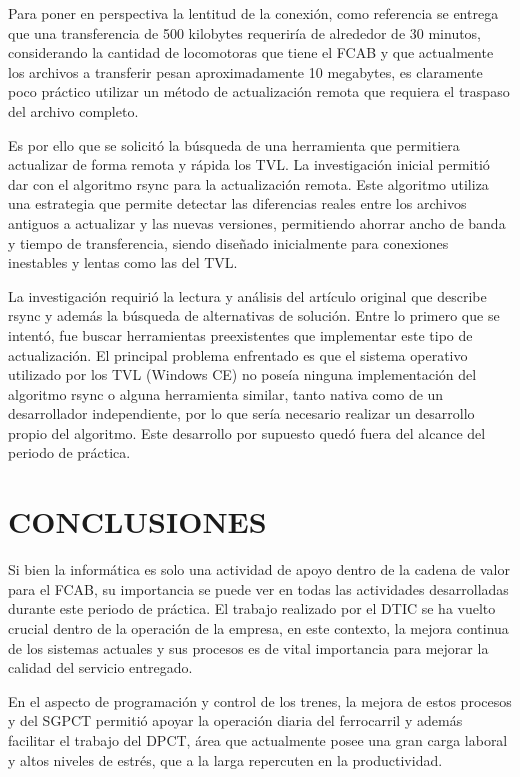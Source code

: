 \documentclass[oneside,12pt, letterpaper, titlepage]{book}
\begin{document}
Para poner en perspectiva la lentitud de la conexión, como referencia se entrega que una transferencia de 500 kilobytes requeriría de alrededor de 30 minutos, considerando la cantidad de locomotoras que tiene el FCAB y que actualmente los archivos a transferir pesan aproximadamente 10 megabytes, es claramente poco práctico utilizar un método de actualización remota que requiera el traspaso del archivo completo.

Es por ello que se solicitó la búsqueda de una herramienta que permitiera actualizar de forma remota y rápida los TVL. La investigación inicial permitió dar con el algoritmo rsync para la actualización remota. Este algoritmo utiliza una estrategia que permite detectar las diferencias reales entre los archivos antiguos a actualizar y las nuevas versiones, permitiendo ahorrar ancho de banda y tiempo de transferencia, siendo diseñado inicialmente para conexiones inestables y lentas como las del TVL.

La investigación requirió la lectura y análisis del artículo original que describe rsync y además la búsqueda de alternativas de solución. Entre lo primero que se intentó, fue buscar herramientas preexistentes que implementar este tipo de actualización. El principal problema enfrentado es que el sistema operativo utilizado por los TVL (Windows CE) no poseía ninguna implementación del algoritmo rsync o alguna herramienta similar, tanto nativa como de un desarrollador independiente, por lo que sería necesario realizar un desarrollo propio del algoritmo. Este desarrollo por supuesto quedó fuera del alcance del periodo de práctica.

\chapter[Conclusiones]{CONCLUSIONES}
Si bien la informática es solo una actividad de apoyo dentro de la cadena de valor para el FCAB, su importancia se puede ver en todas las actividades desarrolladas durante este periodo de práctica. El trabajo realizado por el DTIC se ha vuelto crucial dentro de la operación de la empresa, en este contexto, la mejora continua de los sistemas actuales y sus procesos es de vital importancia para mejorar la calidad del servicio entregado.

En el aspecto de programación y control de los trenes, la mejora de estos procesos y del SGPCT permitió apoyar la operación diaria del ferrocarril y además facilitar el trabajo del DPCT, área que actualmente posee una gran carga laboral y altos niveles de estrés, que a la larga repercuten en la productividad. 
\end{document}
